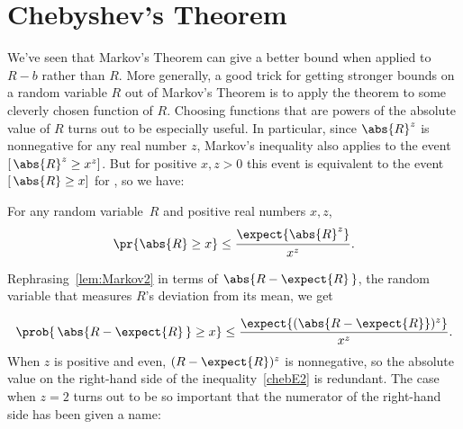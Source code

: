 \begin{problems}

\practiceproblems
{}

\classproblems
{}

\homeworkproblems
{}

\examproblems
{}

\end{problems}

\section{Chebyshev's Theorem}

We've seen that Markov's Theorem can give a better bound when applied
to $R-b$ rather than $R$.  More generally, a good trick for getting
stronger bounds on a random variable $R$ out of Markov's Theorem is to
apply the theorem to some cleverly chosen function of $R$.  Choosing
functions that are powers of the absolute value of $R$ turns out to be
especially useful.  In particular, since $\abs{R}^z$ is nonnegative
for any real number $z$, Markov's inequality also applies to the event
$[\, \abs{R}^z \geq x^z]$.  But for positive $x,z>0$ this event is equivalent
to the event $[\, \abs{R} \geq x]$ for , so we have:

\iffalse
It is a bit messy to apply Markov's Theorem directly to this problem,
because it's generally not easy to compute $\expect{\ \abs{R -
\expect{R}}\ }$.  However, since $\abs{R}$ and hence $\abs{R}^k$ are
nonnegative variables for any $R$, Markov's inequality also applies to the
event $[\abs{R}^k \geq x^k]$.  But this event is equivalent to the event
$[\abs{R} \geq x]$, so we have:
\fi

\begin{lemma}\label{lem:Markov2}
For any random variable~$R$ and positive real numbers $x,z$,
\[
\pr{\abs{R} \geq x} \leq \frac{\expect{\strut \abs{R}^z}}{x^z}.
\]
\end{lemma}
Rephrasing~\eqref{lem:Markov2} in terms of $\abs{R - \expect{R}\, }$,
the random variable that measures $R$'s deviation from its mean, we
get

\begin{equation}\label{chebE2}
  \prob{\,\abs{R - \expect{R}\,} \geq x} \leq \frac{\expect{(\abs{R -
        \expect{R}})^z}}{x^z}.
\end{equation}
When $z$ is positive and even, $(R - \expect{R})^z$ is nonnegative, so
the absolute value on the right-hand side of the
inequality~\eqref{chebE2} is redundant.  The case when $z =2$ turns
out to be so important that the numerator of the right-hand side has
been given a name:

